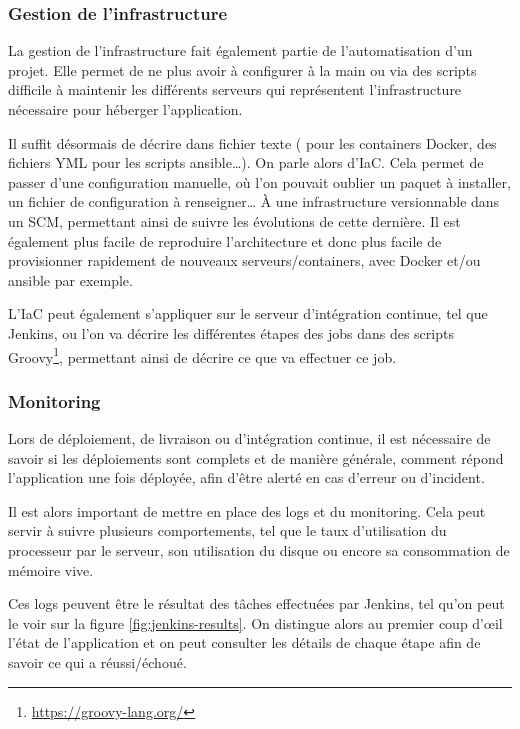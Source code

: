 \subsubsection{Gestion de l'infrastructure}

La gestion de l'infrastructure fait également partie de l'automatisation d'un projet. Elle permet de ne plus avoir à configurer à la main ou via des scripts difficile à maintenir les différents serveurs qui représentent l'infrastructure nécessaire pour héberger l'application.

Il suffit désormais de décrire dans fichier texte ( pour les containers Docker, des fichiers YML pour les scripts ansible\ldots). On parle alors d'\gls{IaC}. Cela permet de passer d'une configuration manuelle, où l'on pouvait oublier un paquet à installer, un fichier de configuration à renseigner\ldots{} À une infrastructure versionnable dans un \gls{SCM}, permettant ainsi de suivre les évolutions de cette dernière. Il est également plus facile de reproduire l'architecture et donc plus facile de provisionner rapidement de nouveaux serveurs/containers, avec Docker et/ou ansible par exemple.

L'\gls{IaC} peut également s'appliquer sur le serveur d'intégration continue, tel que Jenkins, ou l'on va décrire les différentes étapes des jobs dans des scripts Groovy\footnote{\url{https://groovy-lang.org/}}, permettant ainsi de décrire ce que va effectuer ce job.

\subsubsection{Monitoring}\label{paragraph:monitoring}

Lors de déploiement, de livraison ou d'intégration continue, il est nécessaire de savoir si les déploiements sont complets et de manière générale, comment répond l'application une fois déployée, afin d'être alerté en cas d'erreur ou d'incident.

Il est alors important de mettre en place des logs et du monitoring. Cela peut servir à suivre plusieurs comportements, tel que le taux d'utilisation du processeur par le serveur, son utilisation du disque ou encore sa consommation de mémoire vive.

Ces logs peuvent être le résultat des tâches effectuées par Jenkins, tel qu'on peut le voir sur la figure \ref{fig:jenkins-results}. On distingue alors au premier coup d'œil l'état de l'application et on peut consulter les détails de chaque étape afin de savoir ce qui a réussi/échoué.

